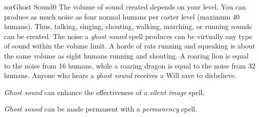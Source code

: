 \begin{spellcard}{sor}{Ghost Sound}{0}
  The volume of sound created depends on your level.
  You can produce as much noise as four normal humans per caster level (maximum 40 humans).
  Thus, talking, singing, shouting, walking, marching, or running sounds can be created.
  The noise a \emph{ghost sound} spell produces can be virtually any type of sound within the volume limit.
  A horde of rats running and squeaking is about the same volume as eight humans running and shouting.
  A roaring lion is equal to the noise from 16 humans,
  while a roaring dragon is equal to the noise from 32 humans.
  Anyone who hears a \emph{ghost sound} receives a Will save to disbelieve.

  \emph{Ghost sound} can enhance the effectiveness of a \emph{silent image} spell.

  \emph{Ghost sound} can be made permanent with a \emph{permanency} spell.

\end{spellcard}
